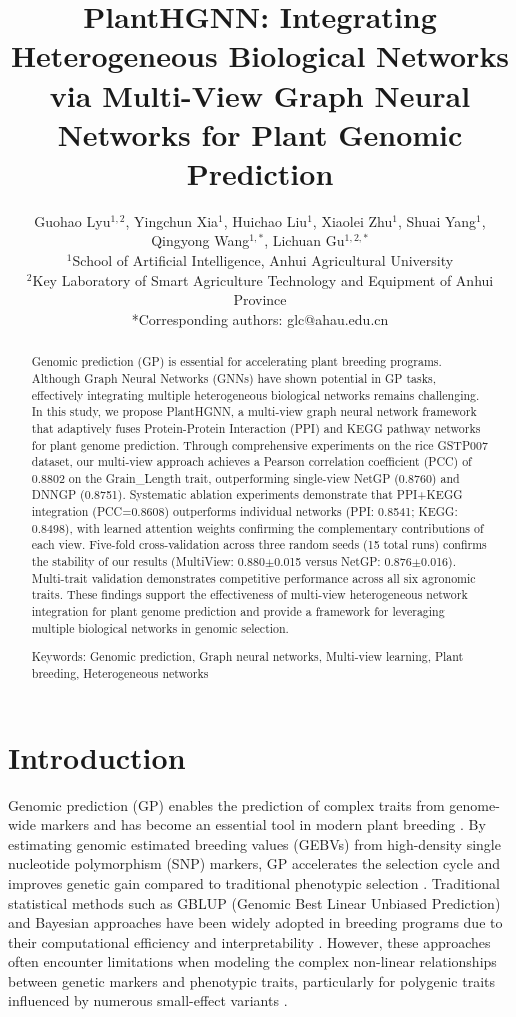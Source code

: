 \documentclass[11pt,a4paper]{article}
\title{\textbf{PlantHGNN: Integrating Heterogeneous Biological Networks via Multi-View Graph Neural Networks for Plant Genomic Prediction}}
\author{Guohao Lyu$^{1,2}$, Yingchun Xia$^{1}$, Huichao Liu$^{1}$, Xiaolei Zhu$^{1}$, Shuai Yang$^{1}$, Qingyong Wang$^{1,*}$, Lichuan Gu$^{1,2,*}$\\
\small{$^1$School of Artificial Intelligence, Anhui Agricultural University}\\
\small{$^2$Key Laboratory of Smart Agriculture Technology and Equipment of Anhui Province}\\
\small{*Corresponding authors: glc@ahau.edu.cn}}
\date{}
\begin{document}
\maketitle

\begin{abstract}
Genomic prediction (GP) is essential for accelerating plant breeding programs. Although Graph Neural Networks (GNNs) have shown potential in GP tasks, effectively integrating multiple heterogeneous biological networks remains challenging. In this study, we propose PlantHGNN, a multi-view graph neural network framework that adaptively fuses Protein-Protein Interaction (PPI) and KEGG pathway networks for plant genome prediction. Through comprehensive experiments on the rice GSTP007 dataset, our multi-view approach achieves a Pearson correlation coefficient (PCC) of 0.8802 on the Grain\_Length trait, outperforming single-view NetGP (0.8760) and DNNGP (0.8751). Systematic ablation experiments demonstrate that PPI+KEGG integration (PCC=0.8608) outperforms individual networks (PPI: 0.8541; KEGG: 0.8498), with learned attention weights confirming the complementary contributions of each view. Five-fold cross-validation across three random seeds (15 total runs) confirms the stability of our results (MultiView: 0.880$\pm$0.015 versus NetGP: 0.876$\pm$0.016). Multi-trait validation demonstrates competitive performance across all six agronomic traits. These findings support the effectiveness of multi-view heterogeneous network integration for plant genome prediction and provide a framework for leveraging multiple biological networks in genomic selection.

Keywords: Genomic prediction, Graph neural networks, Multi-view learning, Plant breeding, Heterogeneous networks
\end{abstract}

\section{Introduction}
\label{sec:introduction}

Genomic prediction (GP) enables the prediction of complex traits from genome-wide markers and has become an essential tool in modern plant breeding \citep{meuwissen2001prediction}. By estimating genomic estimated breeding values (GEBVs) from high-density single nucleotide polymorphism (SNP) markers, GP accelerates the selection cycle and improves genetic gain compared to traditional phenotypic selection \citep{crossa2017genomic}. Traditional statistical methods such as GBLUP (Genomic Best Linear Unbiased Prediction) and Bayesian approaches have been widely adopted in breeding programs due to their computational efficiency and interpretability \citep{vanraden2008efficient,hayes2019100}. However, these approaches often encounter limitations when modeling the complex non-linear relationships between genetic markers and phenotypic traits, particularly for polygenic traits influenced by numerous small-effect variants \citep{meuwissen2001prediction}.
\end{document}
